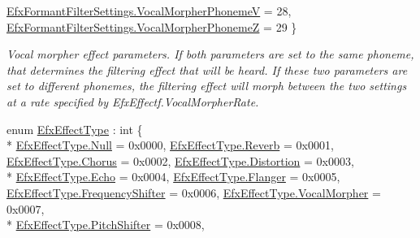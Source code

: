 \begin{DoxyCompactItemize}
\hyperlink{namespace_open_t_k_1_1_audio_1_1_open_a_l_a6c49388702d57d780ffe0f4690e84f49a1a6275c7d79a67ae9d05c451f2916d73}{Efx\-Formant\-Filter\-Settings.\-Vocal\-Morpher\-Phoneme\-V} = 28, 
\hyperlink{namespace_open_t_k_1_1_audio_1_1_open_a_l_a6c49388702d57d780ffe0f4690e84f49a890bef3700ff55211277da3c72f206ed}{Efx\-Formant\-Filter\-Settings.\-Vocal\-Morpher\-Phoneme\-Z} = 29
 \}
\begin{DoxyCompactList}\small\item\em Vocal morpher effect parameters. If both parameters are set to the same phoneme, that determines the filtering effect that will be heard. If these two parameters are set to different phonemes, the filtering effect will morph between the two settings at a rate specified by Efx\-Effectf.\-Vocal\-Morpher\-Rate.\end{DoxyCompactList}\item 
enum \hyperlink{namespace_open_t_k_1_1_audio_1_1_open_a_l_a224be2a7f650eba92828d53342bfbc30}{Efx\-Effect\-Type} \-: int \{ \\*
\hyperlink{namespace_open_t_k_1_1_audio_1_1_open_a_l_a224be2a7f650eba92828d53342bfbc30abbb93ef26e3c101ff11cdd21cab08a94}{Efx\-Effect\-Type.\-Null} = 0x0000, 
\hyperlink{namespace_open_t_k_1_1_audio_1_1_open_a_l_a224be2a7f650eba92828d53342bfbc30a3e90790c668535d048f76550a04adb64}{Efx\-Effect\-Type.\-Reverb} = 0x0001, 
\hyperlink{namespace_open_t_k_1_1_audio_1_1_open_a_l_a224be2a7f650eba92828d53342bfbc30a9dcf77c2f2237c9e2013ea0175bf1745}{Efx\-Effect\-Type.\-Chorus} = 0x0002, 
\hyperlink{namespace_open_t_k_1_1_audio_1_1_open_a_l_a224be2a7f650eba92828d53342bfbc30ad3682f9ce9248e18f2d1cecf9f8fa049}{Efx\-Effect\-Type.\-Distortion} = 0x0003, 
\\*
\hyperlink{namespace_open_t_k_1_1_audio_1_1_open_a_l_a224be2a7f650eba92828d53342bfbc30ad31ef811301c6b4111380dda959d6125}{Efx\-Effect\-Type.\-Echo} = 0x0004, 
\hyperlink{namespace_open_t_k_1_1_audio_1_1_open_a_l_a224be2a7f650eba92828d53342bfbc30a1b2c08c217dc40e7042cea74ab43a446}{Efx\-Effect\-Type.\-Flanger} = 0x0005, 
\hyperlink{namespace_open_t_k_1_1_audio_1_1_open_a_l_a224be2a7f650eba92828d53342bfbc30af5c0e7fb1d6c7d8835fdc18b1a2249dd}{Efx\-Effect\-Type.\-Frequency\-Shifter} = 0x0006, 
\hyperlink{namespace_open_t_k_1_1_audio_1_1_open_a_l_a224be2a7f650eba92828d53342bfbc30af480df1746de91bed6382592dcfe11ba}{Efx\-Effect\-Type.\-Vocal\-Morpher} = 0x0007, 
\\*
\hyperlink{namespace_open_t_k_1_1_audio_1_1_open_a_l_a224be2a7f650eba92828d53342bfbc30a3f8b2180570fa14809c76f07cd904d16}{Efx\-Effect\-Type.\-Pitch\-Shifter} = 0x0008, 

\end{DoxyCompactItemize}
